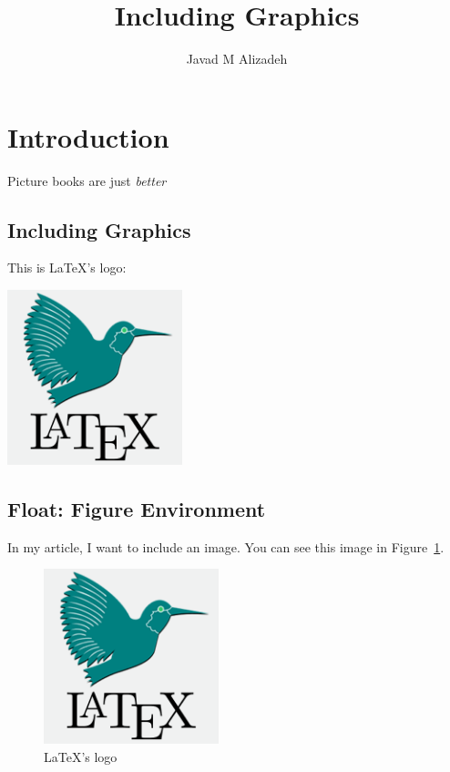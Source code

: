 \documentclass{proc}
\title{Including Graphics}
\author{Javad M Alizadeh}
\date{}
\begin{document}
\maketitle
	
\section{Introduction}

Picture books are just \emph{better}

\subsection{Including Graphics}

This is \LaTeX's logo:
\smallskip
\begin{center}
	\includegraphics[width=2in]{latex.png}
\end{center}


\subsection{Float: Figure Environment}

In my article, I want to include an image. You can see this image in Figure~\ref{fig:latex's logo}.

\begin{figure}[htbp]
	\caption{\LaTeX's logo}
	\begin{center}
		\includegraphics[width=2in]{latex.png}
	\end{center}
	\label{fig:latex's logo}
\end{figure}
\end{document}
